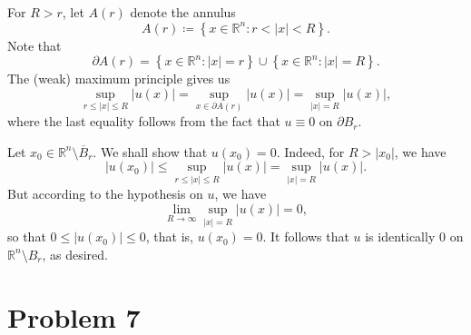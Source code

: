 \documentclass[10pt]{amsart}
\theoremstyle{thmstyle}
\theoremstyle{defstyle}
\newcommand{\R}{\mathbb{R}}
\renewcommand{\le}{\leqslant}
\begin{document}
For $R > r$, let $A(r)$ denote the annulus 
\begin{equation*}
    A(r) \coloneq \left\{x\in\R^n\colon r < |x| < R\right\}.
\end{equation*}
Note that 
\begin{equation*}
    \partial A(r) = \left\{x\in\R^n\colon |x| = r\right\} \cup\left\{x\in\R^n\colon |x| = R\right\}.
\end{equation*}
The (weak) maximum principle gives us 
\begin{equation*}
    \sup_{r\le |x|\le R} |u(x)| = \sup_{x\in\partial A(r)}|u(x)| = \sup_{|x| = R} |u(x)|,
\end{equation*}
where the last equality follows from the fact that $u\equiv 0$ on $\partial B_r$. 

Let $x_0\in\R^n\setminus\overline B_r$. We shall show that $u(x_0) = 0$. Indeed, for $R > |x_0|$, we have 
\begin{equation*}
    |u(x_0)|\le\sup_{r\le |x|\le R} |u(x)| = \sup_{|x| = R} |u(x)|.
\end{equation*}
But according to the hypothesis on $u$, we have 
\begin{equation*}
    \lim_{R\to\infty}\sup_{|x| = R} |u(x)| = 0,
\end{equation*}
so that $0\le |u(x_0)|\le 0$, that is, $u(x_0) = 0$. It follows that $u$ is identically $0$ on $\R^n\setminus B_r$, as desired.

\section{Problem 7}
\end{document}
